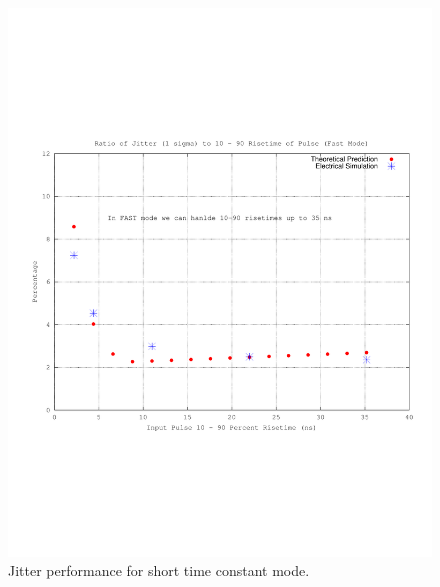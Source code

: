 \documentclass[12pt, onecolumn]{IEEEtran}
\begin{document}
\begin{figure}[htbp!]
	\centering
 	\includegraphics[scale=0.7,keepaspectratio=true]{./images/jitter_fast_mode.pdf} 	
 	\caption{Jitter performance for short time constant mode.}
 	\label{FIG:JITTER_FAST}
 	
\end{figure}
\end{document}
